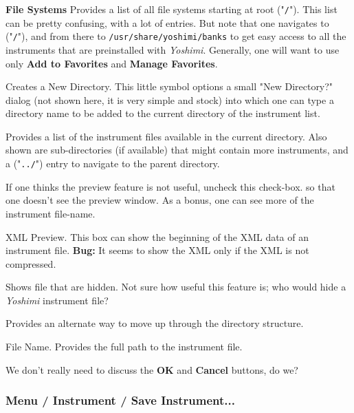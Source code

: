    \textbf{File Systems} 
   Provides a list of all file systems starting at root ("\texttt{/}").
   This list can be pretty confusing, with a lot of entries.
   But note that one navigates to ("\texttt{/}"), and from there to
   \texttt{/usr/share/yoshimi/banks} to get easy access to all the
   instruments that are preinstalled with
   \textsl{Yoshimi}.
   Generally, one will want to use only
   \textbf{Add to Favorites} and \textbf{Manage Favorites}.

   Creates a New Directory.
   This little symbol options a small "New Directory?" dialog (not shown
   here, it is very simple and stock) into which one can type a directory
   name to be added to the current directory of the instrument list.

   Provides a list of the instrument files available in the current
   directory.  Also shown are sub-directories (if available)
   that might contain more instruments, and a ("\texttt{../}") entry
   to navigate to the parent directory.

   If one thinks the preview feature is not useful, uncheck this check-box.
   so that one doesn't see the preview window.  As a bonus, one can see more
   of the instrument file-name.

   XML Preview.
   This box can show the beginning of the XML data of an instrument file.
   \textbf{Bug:}
   It seems to show the XML only if the XML is not compressed.

   Shows file that are hidden.  Not sure how useful this feature is;
   who would hide a \textsl{Yoshimi} instrument file?

   Provides an alternate way to move up through the directory structure.

   File Name.
   Provides the full path to the instrument file.

   We don't really need to discuss the \textbf{OK} and \textbf{Cancel}
   buttons, do we?

\subsubsection{Menu / Instrument / Save Instrument...}
\label{subsubsec:menu_instrument_save}

